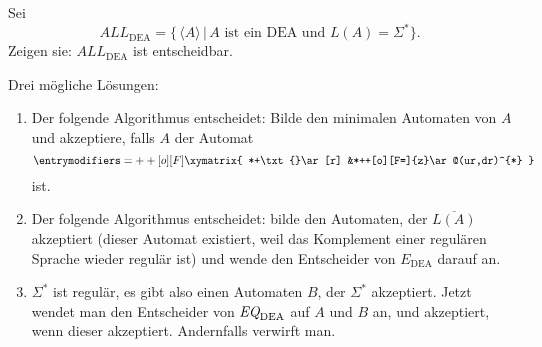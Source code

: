 Sei
\[
{ALL}_{\text{DEA}}=\{\, \langle A\rangle\, |\, \text{$A$ ist ein DEA und $L(A)=\Sigma^*$}\}.
\]
Zeigen sie:
$ALL_{\text{DEA}}$ ist entscheidbar.

\begin{loesung}
Drei mögliche Lösungen:
\begin{enumerate}
\item
Der folgende Algorithmus entscheidet: Bilde den minimalen Automaten von
$A$ und akzeptiere, falls $A$ der Automat
\[
\entrymodifiers={++[o][F]}
\xymatrix{
*+\txt{}\ar[r]
        &*++[o][F=]{z}\ar@(ur,dr)^{*}
}
\]
ist.
\item
Der folgende Algorithmus entscheidet: bilde den Automaten, der
$\overline{L(A)}$ akzeptiert (dieser Automat existiert, weil
das Komplement einer regulären Sprache wieder regulär ist)
und wende den Entscheider von $E_\text{DEA}$ darauf an.
\item
$\Sigma^*$ ist regulär, es gibt also einen Automaten $B$, der
$\Sigma^*$ akzeptiert. Jetzt wendet man den Entscheider von
$\text{\it EQ}_{\text{DEA}}$ auf $A$ und $B$ an, und akzeptiert,
wenn dieser akzeptiert. Andernfalls verwirft man.
\qedhere
\end{enumerate}
\end{loesung}
